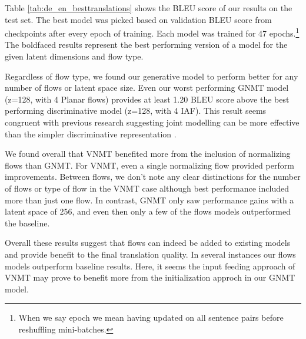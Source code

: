 Table \ref{tab:de_en_besttranslations} shows the BLEU score of our results on the test set. The best model was picked based on validation BLEU score from checkpoints after every epoch of training. Each model was trained for 47 epochs.\footnote{When we say epoch we mean having updated on all sentence pairs before reshuffling mini-batches.} The boldfaced results represent the best performing version of a model for the given latent dimensions and flow type.

Regardless of flow type, we found our generative model to perform better for any number of flows or latent space size. Even our worst performing \ac{GNMT} model (z=128, with 4 Planar flows) provides at least 1.20 BLEU score above the best performing discriminative model (z=128, with 4 \ac{IAF}). This result seems congruent with previous research suggesting joint modelling can be more effective than the simpler discriminative representation \cite{eikema2018AEVNMT}.

We found overall that \ac{VNMT} benefited more from the inclusion of normalizing flows than \ac{GNMT}. For \ac{VNMT}, even a single normalizing flow provided perform improvements. Between flows, we don't note any clear distinctions for the number of flows or type of flow in the \ac{VNMT} case although best performance included more than just one flow. In contrast, \ac{GNMT} only saw performance gains with a latent space of 256, and even then only a few of the flows models outperformed the baseline. 

Overall these results suggest that flows can indeed be added to existing models and provide benefit to the final translation quality. In several instances our flows models outperform baseline results. Here, it seems the input feeding approach of \ac{VNMT} may prove to benefit more from the initialization approch in our \ac{GNMT} model.





